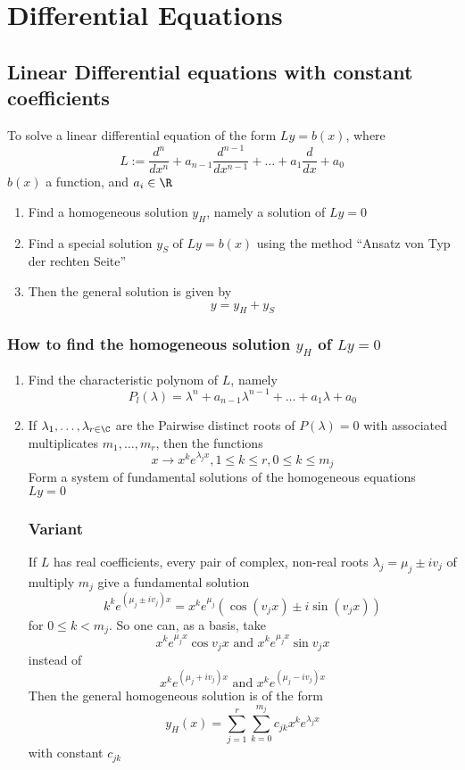 \documentclass[a4paper]{article}
\begin{document}
\section{Differential Equations}
\subsection{Linear Differential equations with constant coefficients}
To solve a linear differential equation of the form $Ly = b(x)$, where
\[L:=\frac{d^n}{dx^n}+a_{n-1}\frac{d^{n-1}}{dx^{n-1}}+\dots+a_1\frac{d}{dx}+a_0\]
$b(x)$ a function, and $a_i\in\R$
\begin{enumerate}
\item Find a homogeneous solution $y_H$, namely a solution of $Ly=0$
\item Find a special solution $y_S$ of $Ly=b(x)$ using the method ``Ansatz von Typ der rechten Seite''
\item Then the general solution is given by \[y=y_H+y_S\]
\end{enumerate}
\subsubsection*{How to find the homogeneous solution $y_H$ of $Ly=0$}
\begin{enumerate}
\item Find the characteristic polynom of $L$, namely \[P_l(\lambda)=\lambda^n+a_{n-1}\lambda^{n-1}+\dots+a_1\lambda+a_0\]
\item \begin{fact}{}
If $\lambda_1,\dots,\lambda_{r\in\C}$ are the Pairwise distinct roots of $P(\lambda)=0$ with associated multiplicates $m_1,\dots,m_r$, then the functions
\[x\to x^ke^{\lambda_jx}, 1\leq k\leq r,0\leq k\leq m_j\]
Form a system of fundamental solutions of the homogeneous equations $Ly=0$
\subsubsection*{Variant}
If $L$ has  real coefficients, every pair of complex, non-real roots $\lambda_j = \mu_j\pm iv_j$ of multiply $m_j$ give a fundamental solution 
\[k^ke^{\left( \mu_j\pm iv_j\right)x} = x^ke^{\mu_j}\left( \cos(v_jx)\pm i\sin(v_jx)\right)\]
for $0\leq k<m_j$. So one can, as a basis, take
\[x^ke^{\mu_j x}\cos v_j x\text{ and }x^ke^{\mu_j x}\sin v_j x\]
instead of 
\[x^ke^{(\mu_j + iv_j)x} \text{ and }x^ke^{(\mu_j-iv_j)x}\]
Then the general homogeneous solution is of the form 
\[y_H(x)=\sum\limits_{j=1}^r\sum\limits_{k=0}^{m_j}c_{jk}x^ke^{\lambda_jx}\]
with constant $c_{jk}$
\end{fact}
\end{enumerate}
\end{document}
